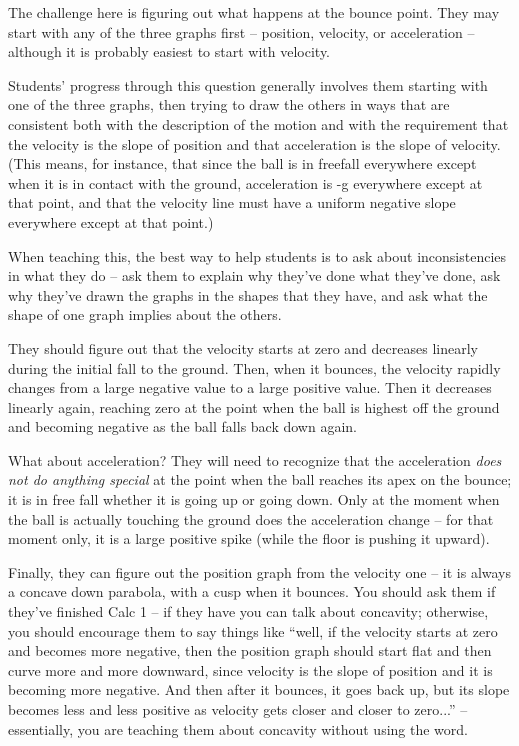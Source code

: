 \documentclass[12pt]{article}
\begin{document}
\begin{enumerate}
{\color{Red}
	The challenge here is figuring out what happens at the bounce point. They may start with any of the three graphs first -- position, velocity, or acceleration -- although it is probably easiest to start with velocity. 
	
	Students' progress through this question generally involves them starting with one of the three graphs, then trying to draw the others in ways that are consistent both with the description of the motion and with the requirement that the velocity is the slope of position and that acceleration is the slope of velocity. (This means, for instance, that since the ball is in freefall everywhere except when it is in contact with the ground, acceleration is -g everywhere except at that point, and that the velocity line must have a uniform negative slope everywhere except at that point.)
	
	When teaching this, the best way to help students is to ask about inconsistencies in what they do -- ask them to explain why they've done what they've done, ask why they've drawn the graphs in the shapes that they have, and ask what the shape of one graph implies about the others.
	
	They should figure out that the velocity starts at zero and decreases linearly during the initial fall to the ground. Then, when it bounces, the velocity rapidly changes from a large negative value to a large positive value. Then it decreases linearly again, reaching zero at the point when the ball is highest off the ground and becoming negative as the ball falls back down again.
	
	What about acceleration? They will need to recognize that the acceleration {\it does not do anything special} at the point when the ball reaches its apex on the bounce; it is in free fall whether it is going up or going down. Only at the moment when the ball is actually touching the ground does the acceleration change -- for that moment only, it is a large positive spike (while the floor is pushing it upward). 
	
	Finally, they can figure out the position graph from the velocity one -- it is always a concave down parabola, with a cusp when it bounces. You should ask them if they've finished Calc 1 -- if they have you can talk about concavity; otherwise, you should encourage them to say things like ``well, if the velocity starts at zero and becomes more negative, then the position graph should start flat and then curve more and more downward, since velocity is the slope of position and it is becoming more negative. And then after it bounces, it goes back up, but its slope becomes less and less positive as velocity gets closer and closer to zero...'' -- essentially, you are teaching them about concavity without using the word.
}
	




\end{enumerate}
\end{document}
